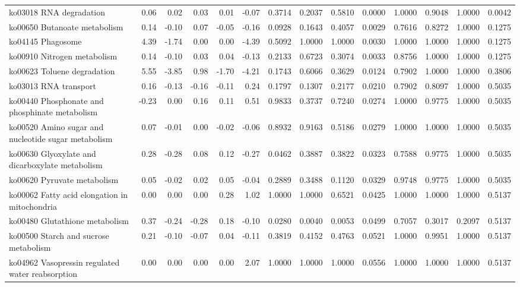 {\begin{landscape}
\begin{longtable}{ | l | r | r | r | r | r | r  | r | r | r | r | r | r  | r  |}
			ko03018  RNA degradation & 0.06 & 0.02 & 0.03 & 0.01 & -0.07 & 0.3714 & 0.2037 & 0.5810 & 0.0000 & 1.0000 & 0.9048 & 1.0000 & 0.0042 \\ 
			ko00650  Butanoate metabolism & 0.14 & -0.10 & 0.07 & -0.05 & -0.16 & 0.0928 & 0.1643 & 0.4057 & 0.0029 & 0.7616 & 0.8272 & 1.0000 & 0.1275 \\ 
			ko04145  Phagosome & 4.39 & -1.74 & 0.00 & 0.00 & -4.39 & 0.5092 & 1.0000 & 1.0000 & 0.0030 & 1.0000 & 1.0000 & 1.0000 & 0.1275 \\ 
			ko00910  Nitrogen metabolism & 0.14 & -0.10 & 0.03 & 0.04 & -0.13 & 0.2133 & 0.6723 & 0.3074 & 0.0033 & 0.8756 & 1.0000 & 1.0000 & 0.1275 \\ 
			ko00623  Toluene degradation & 5.55 & -3.85 & 0.98 & -1.70 & -4.21 & 0.1743 & 0.6066 & 0.3629 & 0.0124 & 0.7902 & 1.0000 & 1.0000 & 0.3806 \\ 
			ko03013  RNA transport & 0.16 & -0.13 & -0.16 & -0.11 & 0.24 & 0.1797 & 0.1307 & 0.2177 & 0.0210 & 0.7902 & 0.8097 & 1.0000 & 0.5035 \\ 
			ko00440  Phosphonate and phosphinate metabolism & -0.23 & 0.00 & 0.16 & 0.11 & 0.51 & 0.9833 & 0.3737 & 0.7240 & 0.0274 & 1.0000 & 0.9775 & 1.0000 & 0.5035 \\ 
			ko00520  Amino sugar and nucleotide sugar metabolism & 0.07 & -0.01 & 0.00 & -0.02 & -0.06 & 0.8932 & 0.9163 & 0.5186 & 0.0279 & 1.0000 & 1.0000 & 1.0000 & 0.5035 \\ 
			ko00630  Glyoxylate and dicarboxylate metabolism & 0.28 & -0.28 & 0.08 & 0.12 & -0.27 & 0.0462 & 0.3887 & 0.3822 & 0.0323 & 0.7588 & 0.9775 & 1.0000 & 0.5035 \\ 
			ko00620  Pyruvate metabolism & 0.05 & -0.02 & 0.02 & 0.05 & -0.04 & 0.2889 & 0.3488 & 0.1120 & 0.0329 & 0.9748 & 0.9775 & 1.0000 & 0.5035 \\ 
			ko00062  Fatty acid elongation in mitochondria & 0.00 & 0.00 & 0.00 & 0.28 & 1.02 & 1.0000 & 1.0000 & 0.6521 & 0.0425 & 1.0000 & 1.0000 & 1.0000 & 0.5137 \\ 
			ko00480  Glutathione metabolism & 0.37 & -0.24 & -0.28 & 0.18 & -0.10 & 0.0280 & 0.0040 & 0.0053 & 0.0499 & 0.7057 & 0.3017 & 0.2097 & 0.5137 \\ 
			ko00500  Starch and sucrose metabolism & 0.21 & -0.10 & -0.07 & 0.04 & -0.11 & 0.3819 & 0.4152 & 0.4763 & 0.0521 & 1.0000 & 0.9951 & 1.0000 & 0.5137 \\ 
			ko04962  Vasopressin regulated water reabsorption & 0.00 & 0.00 & 0.00 & 0.00 & 2.07 & 1.0000 & 1.0000 & 1.0000 & 0.0556 & 1.0000 & 1.0000 & 1.0000 & 0.5137 \\ 

\end{longtable}
\end{landscape}}
